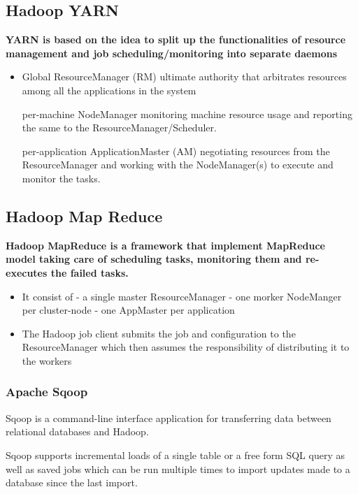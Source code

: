 \subsection{Hadoop YARN}

\textbf{YARN is based on the idea to split up the functionalities of resource management and job scheduling/monitoring into separate daemons}

\begin{itemize}
	\item Global ResourceManager (RM)
	ultimate authority that arbitrates resources among all the applications in the system
	\item [per-machine] NodeManager
	monitoring machine resource usage and reporting the same to the ResourceManager/Scheduler.
	\item [per-application] ApplicationMaster (AM)
	negotiating resources from the ResourceManager and working with the NodeManager(s) to execute and monitor the tasks.
\end{itemize}

\subsection{Hadoop Map Reduce}

\textbf{Hadoop MapReduce is a framework that implement MapReduce model taking care of scheduling tasks, monitoring them and re-executes the failed tasks.}

\begin{itemize}
	\item It consist of
	- a single master ResourceManager
	- one morker NodeManger per cluster-node
	- one AppMaster per application
	\item The Hadoop job client submits the job and configuration to the ResourceManager which then assumes the responsibility of distributing it to the workers
\end{itemize}

\subsubsection{Apache Sqoop}

Sqoop is a command-line interface application for transferring data between relational databases and Hadoop.

Sqoop supports incremental loads of a single table or a free form SQL query as well as saved jobs which can be run multiple times to import updates made to a database since the last import.

